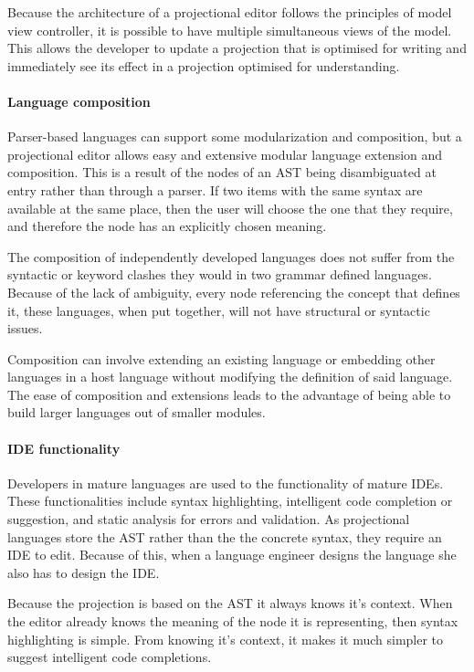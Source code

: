 Because the architecture of a projectional editor follows the principles of model view controller, it is possible to have multiple simultaneous views of the model.
This allows the developer to update a projection that is optimised for writing and immediately see its effect in a projection optimised for understanding.

\paragraph{Language composition}
Parser-based languages can support some modularization and composition, but a projectional editor allows easy and extensive modular language extension and composition.
This is a result of the nodes of an AST being disambiguated at entry rather than through a parser.
If two items with the same syntax are available at the same place, then the user will choose the one that they require, and therefore the node has an explicitly chosen meaning.

The composition of independently developed languages does not suffer from the syntactic or keyword clashes they would in two grammar defined languages.
Because of the lack of ambiguity, every node referencing the concept that defines it, these languages, when put together, will not have structural or syntactic issues.

Composition can involve extending an existing language or embedding other languages in a host language without modifying the definition of said language.
The ease of composition and extensions leads to the advantage of being able to build larger languages out of smaller modules.

\paragraph{IDE functionality}
Developers in mature languages are used to the functionality of mature IDEs.
These functionalities include syntax highlighting, intelligent code completion or suggestion, and static analysis for errors and validation.
As projectional languages store the AST rather than the the concrete syntax, they require an IDE to edit.
Because of this, when a language engineer designs the language she also has to design the IDE.

Because the projection is based on the AST it always knows it's context.
When the editor already knows the meaning of the node it is representing, then syntax highlighting is simple.
From knowing it's context, it makes it much simpler to suggest intelligent code completions.

